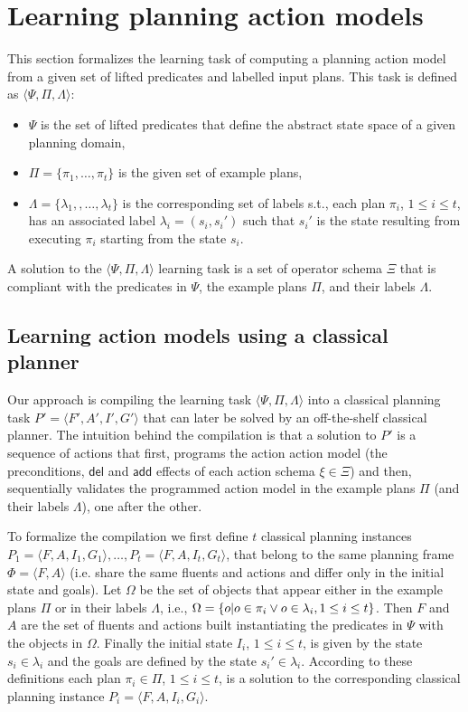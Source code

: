 \documentclass[letterpaper]{article} %
\newcommand{\tup}[1]{{\langle #1 \rangle}}
\newcommand{\del}{\mathsf{del}}     %
\newcommand{\add}{\mathsf{add}}     %
\begin{document}
\section{Learning planning action models}
This section formalizes the learning task of computing a planning action model from a given set of lifted predicates and labelled input plans. This task is defined as $\tup{\Psi,\Pi,\Lambda}$: 
\begin{itemize}
\item $\Psi$ is the set of lifted predicates that define the abstract state space of a given planning domain, 
\item $\Pi=\{\pi_1,\ldots,\pi_t\}$ is the given set of example plans,
\item $\Lambda=\{\lambda_1,,\ldots,\lambda_t\}$ is the corresponding set of labels s.t., each plan $\pi_i$, {\small $1\leq i\leq t$}, has an associated label $\lambda_i=(s_i,s_i')$ such that $s_i'$ is the state resulting from executing $\pi_i$ starting from the state $s_i$. 
\end{itemize}

A solution to the $\tup{\Psi,\Pi,\Lambda}$ learning task is a set of operator schema $\Xi$ that is compliant with the predicates in $\Psi$, the example plans $\Pi$, and their labels $\Lambda$.

\subsection{Learning action models using a classical planner}
Our approach is compiling the learning task $\tup{\Psi,\Pi,\Lambda}$ into a classical planning task $P'=\tup{F',A',I',G'}$ that can later be solved by an off-the-shelf classical planner. The intuition behind the compilation is that a solution to $P'$ is a sequence of actions that first, programs the action action model (the preconditions, $\del$ and $\add$ effects of each action schema $\xi\in\Xi$) and then, sequentially validates the programmed action model in the example plans $\Pi$ (and their labels $\Lambda$), one after the other.

To formalize the compilation we first define $t$ classical planning instances $P_1=\tup{F,A,I_1,G_1},\ldots,P_t=\tup{F,A,I_t,G_t}$, that belong to the same planning frame $\Phi=\tup{F,A}$ (i.e. share the same fluents and actions and differ only in the initial state and goals). Let $\Omega$ be the set of objects that appear either in the example plans $\Pi$ or in their labels $\Lambda$, i.e., $\Omega=\{o|o\in \pi_i \vee o\in \lambda_i, {\small 1\leq i\leq t}\}$. Then $F$ and $A$ are the set of fluents and actions built instantiating the predicates in $\Psi$ with the objects in $\Omega$.  Finally the initial state $I_i$, {\small $1\leq i\leq t$}, is given by the state $s_i\in \lambda_i$ and the goals are defined by the state $s_i'\in \lambda_i$. According to these definitions each plan $\pi_i\in \Pi$, {\small $1\leq i\leq t$}, is a solution to the corresponding classical planning instance $P_i=\tup{F,A,I_i,G_i}$. 
\end{document}
